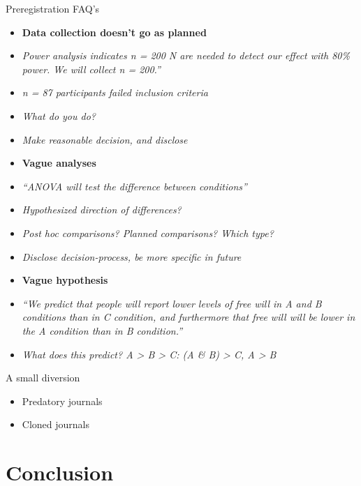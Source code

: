 \documentclass[
  ignorenonframetext,
  aspectratio=169,
]{beamer}
\providecommand{\tightlist}{%
  \setlength{\itemsep}{0pt}\setlength{\parskip}{0pt}}\usepackage{longtable,booktabs,array}
\begin{document}
\begin{frame}{Preregistration FAQ's}
\label{preregistration-faqs-1}
\begin{itemize}
\tightlist
\item
  \textbf{Data collection doesn't go as planned}
\item
  \emph{Power analysis indicates n = 200 N are needed to detect our
  effect with 80\% power. We will collect n = 200.''}
\item
  \emph{n = 87 participants failed inclusion criteria}
\item
  \emph{What do you do?}
\item
  \emph{Make reasonable decision, and disclose}
\item
  \textbf{Vague analyses}
\item
  \emph{``ANOVA will test the difference between conditions''}
\item
  \emph{Hypothesized direction of differences?}
\item
  \emph{Post hoc comparisons? Planned comparisons? Which type?}
\item
  \emph{Disclose decision-process, be more specific in future}
\item
  \textbf{Vague hypothesis}
\item
  \emph{``We predict that people will report lower levels of free will
  in A and B conditions than in C condition, and furthermore that free
  will will be lower in the A condition than in B condition.''}
\item
  \emph{What does this predict? A \textgreater{} B \textgreater{} C: (A
  \& B) \textgreater{} C, A \textgreater{} B}
\end{itemize}
\end{frame}

\begin{frame}{A small diversion}
\label{a-small-diversion}
\begin{itemize}
\tightlist
\item
  Predatory journals
\item
  Cloned journals
\end{itemize}
\end{frame}

\section{Conclusion}\label{conclusion}

\begin{frame}{}
\label{section-3}
\end{frame}
\end{document}
